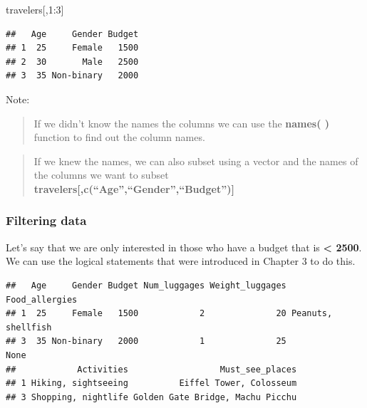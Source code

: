 \documentclass[
]{book}
\newenvironment{Shaded}{\begin{snugshade}}{\end{snugshade}}
\newcommand{\DecValTok}[1]{\textcolor[rgb]{0.00,0.00,0.81}{#1}}
\newcommand{\NormalTok}[1]{#1}
\newcommand{\SpecialCharTok}[1]{\textcolor[rgb]{0.00,0.00,0.00}{#1}}
\begin{document}
\begin{Shaded}
\begin{Highlighting}[]
\NormalTok{travelers[,}\DecValTok{1}\SpecialCharTok{:}\DecValTok{3}\NormalTok{]}
\end{Highlighting}
\end{Shaded}

\begin{verbatim}
##   Age     Gender Budget
## 1  25     Female   1500
## 2  30       Male   2500
## 3  35 Non-binary   2000
\end{verbatim}

Note:

\begin{quote}
If we didn't know the names the columns we can use the \textbf{names( )} function to find out the column names.
\end{quote}

\begin{quote}
If we knew the names, we can also subset using a vector and the names of the columns we want to subset \textbf{travelers{[},c(``Age'',``Gender'',``Budget''){]}}
\end{quote}

\hypertarget{filtering-data}{%
\subsubsection{Filtering data}\label{filtering-data}}

Let's say that we are only interested in those who have a budget that is \textbf{\textless{} 2500}. We can use the logical statements that were introduced in Chapter 3 to do this.

\begin{Shaded}
\end{Shaded}

\begin{verbatim}
##   Age     Gender Budget Num_luggages Weight_luggages     Food_allergies
## 1  25     Female   1500            2              20 Peanuts, shellfish
## 3  35 Non-binary   2000            1              25               None
##            Activities                  Must_see_places
## 1 Hiking, sightseeing          Eiffel Tower, Colosseum
## 3 Shopping, nightlife Golden Gate Bridge, Machu Picchu
\end{verbatim}
\end{document}

